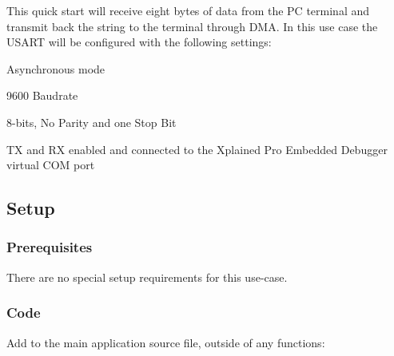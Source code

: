 This quick start will receive eight bytes of data from the PC terminal and transmit back the string to the terminal through D\+MA. In this use case the U\+S\+A\+RT will be configured with the following settings\+:
\begin{DoxyItemize}
\item Asynchronous mode
\item 9600 Baudrate
\item 8-\/bits, No Parity and one Stop Bit
\item TX and RX enabled and connected to the Xplained Pro Embedded Debugger virtual C\+OM port
\end{DoxyItemize}\hypertarget{asfdoc_sam0_sercom_usart_dma_use_case_asfdoc_sam0_sercom_usart_dma_use_case_setup}{}\subsection{Setup}\label{asfdoc_sam0_sercom_usart_dma_use_case_asfdoc_sam0_sercom_usart_dma_use_case_setup}
\hypertarget{asfdoc_sam0_sercom_usart_dma_use_case_asfdoc_sam0_sercom_usart_dma_use_case_prereq}{}\subsubsection{Prerequisites}\label{asfdoc_sam0_sercom_usart_dma_use_case_asfdoc_sam0_sercom_usart_dma_use_case_prereq}
There are no special setup requirements for this use-\/case.\hypertarget{asfdoc_sam0_sercom_usart_dma_use_case_asfdoc_sam0_usart_dma_use_case_setup_code}{}\subsubsection{Code}\label{asfdoc_sam0_sercom_usart_dma_use_case_asfdoc_sam0_usart_dma_use_case_setup_code}
Add to the main application source file, outside of any functions\+: 
\begin{DoxyCodeInclude}{0}
\end{DoxyCodeInclude}

\begin{DoxyCodeInclude}{0}
\end{DoxyCodeInclude}

\begin{DoxyCodeInclude}{0}
\end{DoxyCodeInclude}

